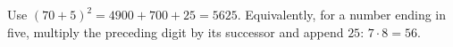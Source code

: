 Use $(70+5)^2=4900+700+25=\boxed{5625}$. Equivalently, for a number ending in five, multiply the preceding digit by its successor and append $25$: $7\cdot 8=56$.
